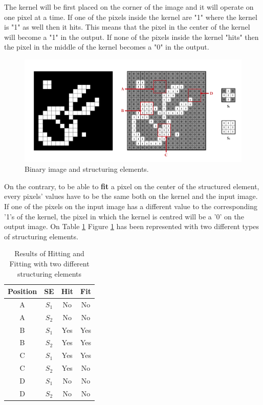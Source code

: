 The kernel will be first placed on the corner of the image and it will operate on one pixel at a time. If one of the pixels inside the kernel are "1" where the kernel is "1" as well then it hits. This means that the pixel in the center of the kernel will become a "1" in the output. If none of the pixels inside the kernel "hits" then the pixel in the middle of the kernel becomes a "0" in the output.

\begin{figure}[htbp]
\centering
\includegraphics[width=1\textwidth]{Pictures/Theory/FitHitKernels.png}
\caption{Binary image and structuring elements.}
\label{fig:FitHit}
\end{figure}

On the contrary, to be able to \textbf{fit} a pixel on the center of the structured element, every pixels' values have to be the same both on the kernel and the input image. If one of the pixels on the input image has a different value to the corresponding '1's of the kernel, the pixel in which the kernel is centred will be a '0' on the output image. On Table \ref{tab:HitFitResults} Figure \ref{fig:FitHit} has been represented with two different types of structuring elements.
\begin{table}[htbp]
\centering
\begin{tabular}{|c|c|c|c|}
\hline
 \:Position\: &SE &\:\:\:Hit\:\:\: &\:\:\:Fit\:\:\: \\\hline
 \hline
 A &$S_{1}$ &No &No\\\hline
 A &$S_{2}$ &No &No\\\hline
 B &$S_{1}$ &Yes &Yes\\\hline
 B &$S_{2}$ &Yes &Yes\\\hline
 C &$S_{1}$ &Yes &Yes\\\hline
 C &$S_{2}$ &Yes &No\\\hline
 D &$S_{1}$ &No &No\\\hline
 D &$S_{2}$ &No &No\\\hline
\end{tabular}
\caption{Results of Hitting and Fitting with two different structuring elements}
\label{tab:HitFitResults}
\end{table}

